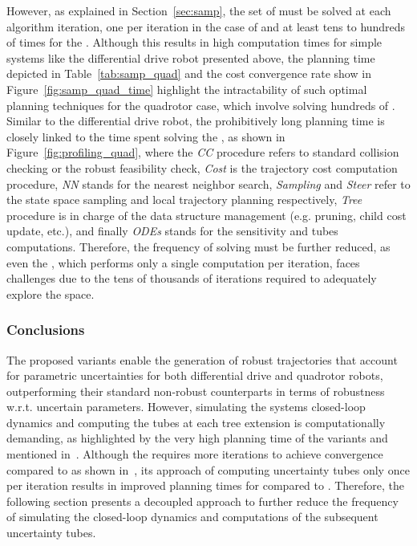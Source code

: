 However, as explained in Section~\ref{sec:samp}, the set of  must be solved at each algorithm iteration, one per iteration in the case of  and at least tens to hundreds of times for the .
Although this results in high computation times for simple systems like the differential drive robot presented above, the planning time depicted in Table~\ref{tab:samp_quad} and the cost convergence rate show in Figure~\ref{fig:samp_quad_time} highlight the intractability of such optimal planning techniques for the quadrotor case, which involve solving hundreds of .
Similar to the differential drive robot, the prohibitively long planning time is closely linked to the time spent solving the , as shown in Figure~\ref{fig:profiling_quad}, where the \emph{CC} procedure refers to standard collision checking or the robust feasibility check, \emph{Cost} is the trajectory cost computation procedure, \emph{NN} stands for the nearest neighbor search, \emph{Sampling} and \emph{Steer} refer to the state space sampling and local trajectory planning respectively, \emph{Tree} procedure is in charge of the data structure management (e.g. pruning, child cost update, etc.), and finally \emph{ODEs} stands for the sensitivity and tubes computations.
Therefore, the frequency of  solving must be further reduced, as even the , which performs only a single computation per iteration, faces challenges due to the tens of thousands of iterations required to adequately explore the space.

\subsubsection{Conclusions}

The proposed  variants enable the generation of robust trajectories that account for parametric uncertainties for both differential drive and quadrotor robots, outperforming their standard non-robust counterparts in terms of robustness w.r.t. uncertain parameters.
However, simulating the systems closed-loop dynamics and computing the tubes at each tree extension is computationally demanding, as highlighted by the very high planning time of the  variants and mentioned in~\cite{cTognon}.
Although the  requires more iterations to achieve convergence compared to  as shown in~\cite{cSST}, its approach of computing uncertainty tubes only once per iteration results in improved planning times for  compared to .
Therefore, the following section presents a decoupled approach to further reduce the frequency of simulating the closed-loop dynamics and computations of the subsequent uncertainty tubes.


